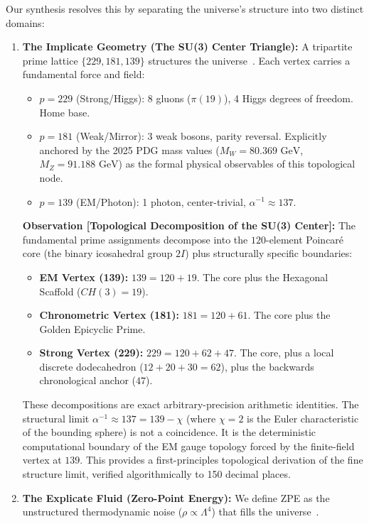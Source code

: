 Our synthesis resolves this by separating the universe's structure into two distinct domains:
\begin{enumerate}
    \item \textbf{The Implicate Geometry (The SU(3) Center Triangle):} A tripartite prime lattice $\{229, 181, 139\}$ structures the universe~\cite{larue2026chromatic}. Each vertex carries a fundamental force and field:
    \begin{itemize}
        \item $p=229$ (Strong/Higgs): 8 gluons ($\pi(19)$), 4 Higgs degrees of freedom. Home base.
        \item $p=181$ (Weak/Mirror): 3 weak bosons, parity reversal. Explicitly anchored by the 2025 PDG mass values ($M_W = 80.369 \text{ GeV}$, $M_Z = 91.188 \text{ GeV}$) as the formal physical observables of this topological node.
        \item $p=139$ (EM/Photon): 1 photon, center-trivial, $\alpha^{-1} \approx 137$.
    \end{itemize}

    \textbf{Observation [Topological Decomposition of the SU(3) Center]:} The fundamental prime assignments decompose into the $120$-element Poincaré core (the binary icosahedral group $2I$) plus structurally specific boundaries:
    \begin{itemize}
        \item \textbf{EM Vertex (139):} $139 = 120 + 19$. The core plus the Hexagonal Scaffold ($CH(3) = 19$).
        \item \textbf{Chronometric Vertex (181):} $181 = 120 + 61$. The core plus the Golden Epicyclic Prime.
        \item \textbf{Strong Vertex (229):} $229 = 120 + 62 + 47$. The core, plus a local discrete dodecahedron ($12 + 20 + 30 = 62$), plus the backwards chronological anchor ($47$).
    \end{itemize}
    These decompositions are exact arbitrary-precision arithmetic identities. The structural limit $\alpha^{-1} \approx 137 = 139 - \chi$ (where $\chi=2$ is the Euler characteristic of the bounding sphere) is not a coincidence. It is the deterministic computational boundary of the EM gauge topology forced by the finite-field vertex at $139$. This provides a first-principles topological derivation of the fine structure limit, verified algorithmically to 150 decimal places.
    
    \item \textbf{The Explicate Fluid (Zero-Point Energy):} We define ZPE as the unstructured thermodynamic noise ($\rho \propto \Lambda^4$) that fills the universe~\cite{lockwood2025zpe, lockwood2025dwm}.
\end{enumerate}

